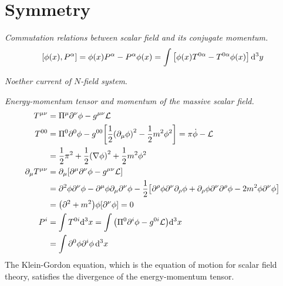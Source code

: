 \documentclass{report}
\begin{document}
\chapter{Symmetry}

\begin{subquests}
	\item \emph{Commutation relations between scalar field and its conjugate momentum.}
	\begin{gather*}
		\bqty{\phi(x),P^{\alpha}} = \phi(x)P^{\alpha} - P^{\alpha}\phi(x) =  \int \bqty{\phi(x) T^{0\alpha} - T^{0\alpha}\phi(x)}\,\dd^3{y}
	\end{gather*}

	\item \emph{Noether current of $N$-field system}.

	\item \emph{Energy-momentum tensor and momentum of the massive scalar field.}
	\begin{align*}
		T^{\mu\nu} & = \Pi^{\mu}\partial^{\nu}\phi - g^{\mu\nu}\cal{L} \\
		T^{00} & = \Pi^{0}\partial^{0}\phi - g^{00}\bqty{\frac{1}{2}\pqty{\partial_{\mu}\phi}^2 - \frac{1}{2}m^2\phi^2} = \pi\dot{\phi} - \mathcal L \\ 
		& = \frac{1}{2}\pi^2 + \frac{1}{2}\pqty{\nabla{\phi}}^2 + \frac{1}{2}m^2\phi^2 \\
		\partial_{\mu}T^{\mu\nu} & = \partial_{\mu}\bqty{\partial^{\mu}\partial^{\nu}\phi - g^{\mu\nu}\cal{L}} \\
		& = \partial^2\phi\partial^{\nu}\phi - \partial^{\mu}\phi\partial_{\mu}\partial^{\nu}\phi - \frac{1}{2}\bqty{\partial^{\rho}\phi \partial^{\nu}\partial_{\rho}\phi+ \partial_{\rho}\phi\partial^{\nu}\partial^{\rho}\phi - 2m^2\phi\partial^{\nu}\phi} \\
		& = \pqty{\partial^2 + m^2}\phi\bqty{\partial^{\nu}\phi} = 0 \\
		P^i & = \int T^{0i}\dd^3{x} = \int \pqty{\Pi^0\partial^i \phi - g^{0i}\cal{L}}\dd^3{x} \\
		& = \int \partial^0\phi\partial^i\phi\,\dd^3{x}
	\end{align*}
	The Klein-Gordon equation, which is the equation of motion for scalar field theory, satisfies the divergence of the energy-momentum tensor.


\end{subquests}
\end{document}
